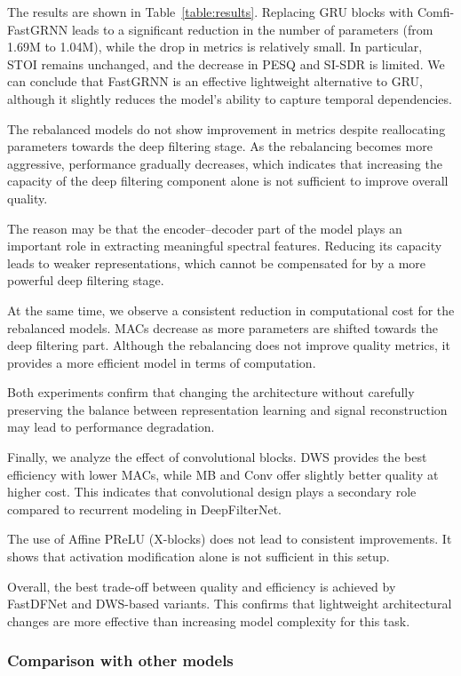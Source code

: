 \documentclass[a4paper,12pt]{extarticle}
\begin{document}
The results are shown in Table~\ref{table:results}. Replacing GRU blocks with Comfi-FastGRNN leads to a significant reduction in the number of parameters (from 1.69M to 1.04M),
while the drop in metrics is relatively small. In particular, STOI remains unchanged, and the decrease in PESQ and SI-SDR 
is limited. We can conclude that FastGRNN is an effective lightweight alternative to GRU, although it slightly reduces the
model's ability to capture temporal dependencies.

The rebalanced models do not show improvement in metrics despite reallocating parameters towards the deep filtering stage.
As the rebalancing becomes more aggressive, performance gradually decreases, which indicates that increasing the capacity of
the deep filtering component alone is not sufficient to improve overall quality.

The reason may be that the encoder--decoder part of the model plays an important role in extracting meaningful
spectral features. Reducing its capacity leads to weaker representations, which cannot be compensated for by a more powerful
deep filtering stage.

At the same time, we observe a consistent reduction in computational cost for the rebalanced models. MACs
decrease as more parameters are shifted towards the deep filtering part. Although the rebalancing
does not improve quality metrics, it provides a more efficient model in terms of computation.

Both experiments confirm that changing the architecture without carefully preserving the balance between representation
learning and signal reconstruction may lead to performance degradation.

Finally, we analyze the effect of convolutional blocks. DWS provides the best efficiency with lower MACs, while MB and
Conv offer slightly better quality at higher cost. This indicates that convolutional design plays a secondary role
compared to recurrent modeling in DeepFilterNet.

The use of Affine PReLU (X-blocks) does not lead to consistent improvements. It shows that activation modification alone is not sufficient in this setup.

Overall, the best trade-off between quality and efficiency is achieved by FastDFNet and DWS-based variants. This
confirms that lightweight architectural changes are more effective than increasing model complexity for this task.

\subsubsection{Comparison with other models}
\end{document}
